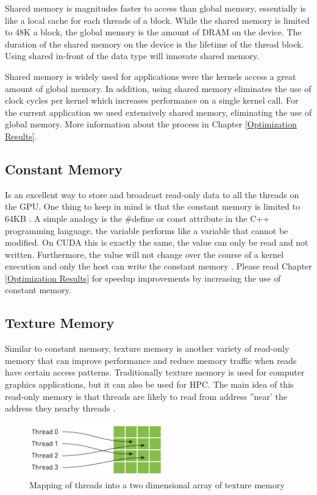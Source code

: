 Shared memory is magnitudes faster to access than global memory, essentially is like a local cache for each threads of a block. While  the shared memory is limited to 48K a block, the global memory is the amount of DRAM on the device. The duration of the shared memory on the device is the lifetime of the thread block. Using \twoline shared \twoline in-front of the data type will innovate shared memory.

Shared memory is widely used for applications were the kernels access a great amount of global memory. In addition, using shared memory eliminates the use of clock cycles per kernel which increases performance on a single kernel call. For the current application we used extensively shared memory, eliminating the use of global memory. More information about the process in Chapter \ref{Optimization Results}.

   
\subsection{Constant Memory}

Is an excellent way to store and broadcast read-only data to all the threads on the GPU. One thing to keep in mind is that the constant memory is limited to 64KB \cite{design}. A simple analogy is the {\listf \#define} or {\listf const} attribute in the C++ programming language, the variable performs like a variable that cannot be modified. On CUDA this is exactly the same, the value can only be read and not written. Furthermore, the value will not change over the course of a kernel execution and only the host can write the constant memory \cite{example}. Please read Chapter \ref{Optimization Results} for speedup improvements by increasing the use of constant memory.

\subsection{Texture Memory}

Similar to constant memory, texture memory is another variety of read-only memory that can improve performance and reduce memory traffic when reads have certain access patterns. Traditionally texture memory is used for computer graphics applications, but it can also be used for HPC. The main idea of this read-only memory is that threads are likely to read from address ''near' the address they nearby threads \cite{example}.

\begin{figure}[htbp]
	\centering
		\includegraphics[width=0.52\textwidth]{Figures/texture.png}
		\smallskip
	\caption[Texture Memory]{Mapping of threads into a two dimensional array of texture memory \cite{hwu}}
	\label{fig:texture}
\end{figure}

